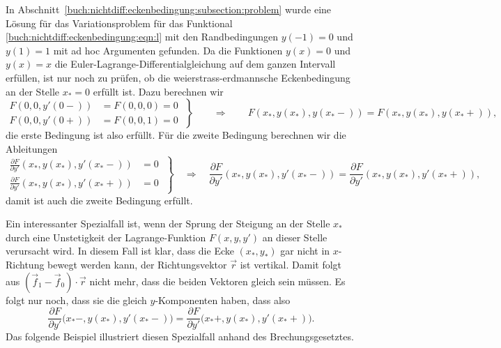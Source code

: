 \begin{beispiel}
In Abschnitt~\ref{buch:nichtdiff:eckenbedingung:subsection:problem}
wurde eine Lösung für das Variationsproblem für das Funktional
\eqref{buch:nichtdiff:eckenbedingung:eqn:l} mit den Randbedingungen
$y(-1)=0$ und $y(1)=1$ mit ad hoc Argumenten gefunden.
Da die Funktionen $y(x)=0$ und $y(x)=x$ die
Euler-Lagrange-Differentialgleichung auf dem ganzen Intervall
erfüllen, ist nur noch zu prüfen, ob die weierstrass-erdmannsche
Eckenbedingung an der Stelle $x_*=0$ erfüllt ist.
Dazu berechnen wir 
\begin{equation}
\left.
\begin{aligned}
F(0,0,y'(0-))&=F(0,0,0)=0
\\
F(0,0,y'(0+))&=F(0,0,1)=0
\end{aligned}
\;
\right\}
\qquad\Rightarrow\qquad
F(x_*,y(x_*),y(x_*-))=F(x_*,y(x_*),y(x_*+)),
\end{equation}
die erste Bedingung ist also erfüllt.
Für die zweite Bedingung berechnen wir die Ableitungen
\[
\left.
\begin{aligned}
\frac{\partial F}{\partial y'}(x_*,y(x_*),y'(x_*-))
&=
0
\\
\frac{\partial F}{\partial y'}(x_*,y(x_*),y'(x_*+))
&=
0
\end{aligned}
\;\right\}
\quad\Rightarrow\quad
\frac{\partial F}{\partial y'}(x_*,y(x_*),y'(x_*-))
=
\frac{\partial F}{\partial y'}(x_*,y(x_*),y'(x_*+)),
\]
damit ist auch die zweite Bedingung erfüllt.
\end{beispiel}

Ein interessanter Spezialfall ist, wenn der Sprung der Steigung
an der Stelle $x_*$ durch eine Unstetigkeit der Lagrange-Funktion
$F(x,y,y')$ an dieser Stelle verursacht wird.
In diesem Fall ist klar, dass die Ecke $(x_*,y_*)$ gar nicht in
$x$-Richtung bewegt werden kann, der Richtungsvektor $\vec{r}$ ist
vertikal.
Damit folgt aus $(\vec{f}_1-\vec{f}_0)\cdot\vec{r}$ nicht mehr,
dass die beiden Vektoren gleich sein müssen.
Es folgt nur noch, dass sie die gleich $y$-Komponenten haben,
dass also
\begin{equation}
\frac{\partial F}{\partial y'}\bigl(x_*-,y(x_*),y'(x_*-)\bigr)
=
\frac{\partial F}{\partial y'}\bigl(x_*+,y(x_*),y'(x_*+)\bigr).
\label{buch:nichtdiff:eckenbedingung:eqn:we0}
\end{equation}
Das folgende Beispiel illustriert diesen Spezialfall anhand des
Brechungsgesetztes.

